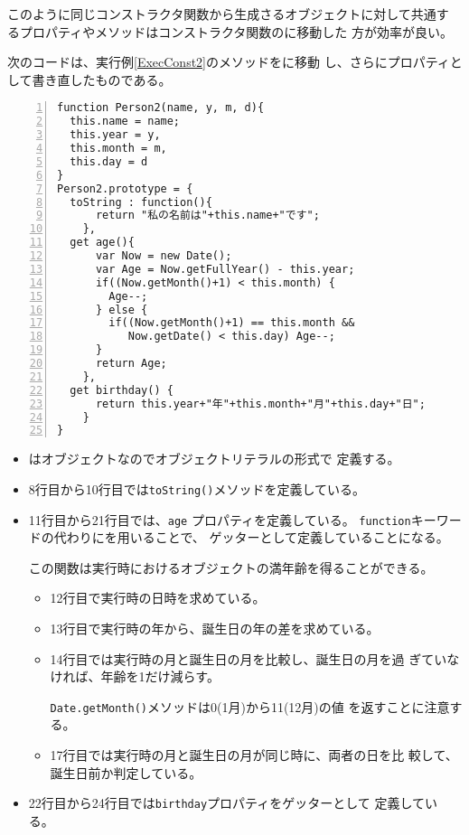  このように同じコンストラクタ関数から生成さるオブジェクトに対して共通す
 るプロパティやメソッドはコンストラクタ関数のに移動した
 方が効率が良い。
 \begin{Exec}\upshape\label{Execconst3}
  次のコードは、実行例\ref{ExecConst2}のメソッドをに移動
  し、さらにプロパティとして書き直したものである。
\begin{Verbatim}[numbers=left]
function Person2(name, y, m, d){
  this.name = name;
  this.year = y,
  this.month = m,
  this.day = d
}
Person2.prototype = {
  toString : function(){
      return "私の名前は"+this.name+"です";
    },
  get age(){
      var Now = new Date();
      var Age = Now.getFullYear() - this.year;
      if((Now.getMonth()+1) < this.month) {
        Age--;
      } else {
        if((Now.getMonth()+1) == this.month &&
           Now.getDate() < this.day) Age--;
      }
      return Age;
    },
  get birthday() {
      return this.year+"年"+this.month+"月"+this.day+"日";
    }
}
\end{Verbatim}
 \end{Exec}
 \begin{itemize}
  \item {}はオブジェクトなのでオブジェクトリテラルの形式で
        定義する。
  \item 8行目から10行目では\texttt{toString()}メソッドを定義している。
  \item 11行目から21行目では、\texttt{age} プロパティを定義している。
        \texttt{function}キーワードの代わりにを用いることで、
        ゲッターとして定義していることになる。

        この関数は実行時におけるオブジェクトの満年齢を得ることができる。
        \begin{itemize}
         \item 12行目で実行時の日時を求めている。
         \item 13行目で実行時の年から、誕生日の年の差を求めている。
         \item 14行目では実行時の月と誕生日の月を比較し、誕生日の月を過
               ぎていなければ、年齢を1だけ減らす。

               \texttt{Date.getMonth()}メソッドは0(1月)から11(12月)の値
               を返すことに注意する。
         \item 17行目では実行時の月と誕生日の月が同じ時に、両者の日を比
               較して、誕生日前か判定している。
        \end{itemize}
  \item 22行目から24行目では\texttt{birthday}プロパティをゲッターとして
        定義している。
 \end{itemize}
